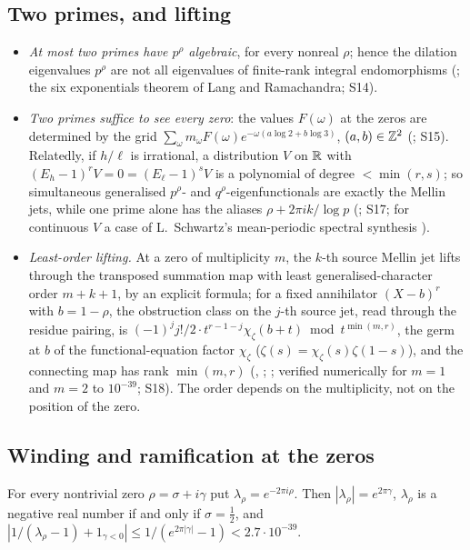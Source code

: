 \subsection{Two primes, and lifting}

\begin{itemize}
\item \emph{At most two primes have $p^\rho$ algebraic}, for every nonreal $\rho$; hence the dilation eigenvalues $p^\rho$ are not all eigenvalues of finite-rank integral endomorphisms (; the six exponentials theorem of Lang and Ramachandra; S14).
\item \emph{Two primes suffice to see every zero}: the values $F(\omega)$ at the zeros are determined by the grid $\sum_\omega m_\omega F(\omega)e^{-\omega(a\log2+b\log3)}$, $(a,b)\in\mathbb{Z}^2$ (; S15). Relatedly, if $h/\ell$ is irrational, a distribution $V$ on $\mathbb{R}$ with $(E_h-1)^rV=0=(E_\ell-1)^sV$ is a polynomial of degree $<\min(r,s)$; so simultaneous generalised $p^\rho$- and $q^\rho$-eigenfunctionals are exactly the Mellin jets, while one prime alone has the aliases $\rho+2\pi ik/\log p$ (; S17; for continuous $V$ a case of L.~Schwartz's mean-periodic spectral synthesis \cite{SchwartzMP}).
\item \emph{Least-order lifting.} At a zero of multiplicity $m$, the $k$-th source Mellin jet lifts through the transposed summation map with least generalised-character order $m+k+1$, by an explicit formula; for a fixed annihilator $(X-b)^r$ with $b=1-\rho$, the obstruction class on the $j$-th source jet, read through the residue pairing, is $(-1)^jj!/2\cdot t^{r-1-j}\chi_\zeta(b+t)\bmod t^{\min(m,r)}$, the germ at $b$ of the functional-equation factor $\chi_\zeta$ ($\zeta(s)=\chi_\zeta(s)\zeta(1-s)$), and the connecting map has rank $\min(m,r)$ (, ; ; verified numerically for $m=1$ and $m=2$ to $10^{-39}$; S18). The order depends on the multiplicity, not on the position of the zero.
\end{itemize}

\subsection{Winding and ramification at the zeros}

\begin{lemma}\label{lem:winding}
For every nontrivial zero $\rho=\sigma+i\gamma$ put $\lambda_\rho=e^{-2\pi i\rho}$. Then $|\lambda_\rho|=e^{2\pi\gamma}$, $\lambda_\rho$ is a negative real number if and only if $\sigma=\tfrac12$, and $|1/(\lambda_\rho-1)+1_{\gamma<0}|\le1/(e^{2\pi|\gamma|}-1)<2.7\cdot10^{-39}$.
\end{lemma}

